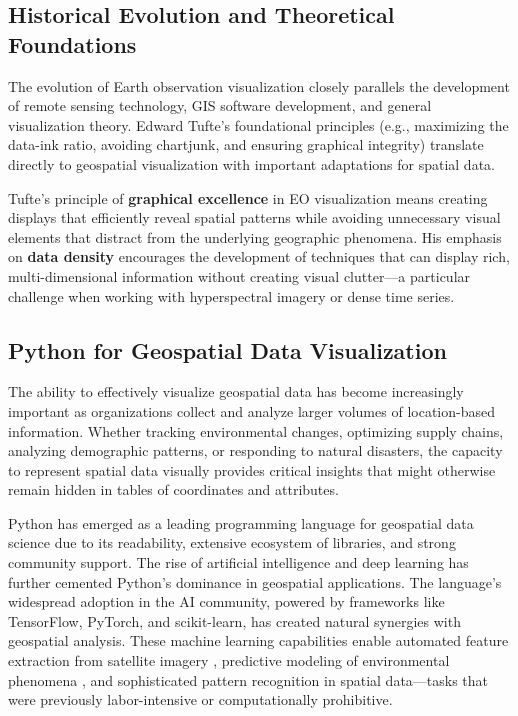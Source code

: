 \subsection{Historical Evolution and Theoretical Foundations}

The evolution of Earth observation visualization closely parallels the development of remote sensing technology, GIS software development, and general visualization theory. Edward Tufte's foundational principles (e.g., maximizing the data-ink ratio, avoiding chartjunk, and ensuring graphical integrity) \citep{Tufte2001} translate directly to geospatial visualization with important adaptations for spatial data.

Tufte's principle of \textbf{graphical excellence} in EO visualization means creating displays that efficiently reveal spatial patterns while avoiding unnecessary visual elements that distract from the underlying geographic phenomena. His emphasis on \textbf{data density} encourages the development of techniques that can display rich, multi-dimensional information without creating visual clutter—a particular challenge when working with hyperspectral imagery or dense time series.

\subsection{Python for Geospatial Data Visualization}

The ability to effectively visualize geospatial data has become increasingly important as organizations collect and analyze larger volumes of location-based information. Whether tracking environmental changes, optimizing supply chains, analyzing demographic patterns, or responding to natural disasters, the capacity to represent spatial data visually provides critical insights that might otherwise remain hidden in tables of coordinates and attributes.

Python has emerged as a leading programming language for geospatial data science due to its readability, extensive ecosystem of libraries, and strong community support. The rise of artificial intelligence and deep learning has further cemented Python's dominance in geospatial applications. The language's widespread adoption in the AI community, powered by frameworks like TensorFlow, PyTorch, and scikit-learn, has created natural synergies with geospatial analysis. These machine learning capabilities enable automated feature extraction from satellite imagery \citep{Osco2023, Wu2023}, predictive modeling of environmental phenomena \citep{Cui2023}, and sophisticated pattern recognition \citep{Li2018} in spatial data—tasks that were previously labor-intensive or computationally prohibitive.

